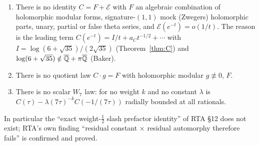 \begin{proposition}\label{prop:noscalar8}
\begin{enumerate}[label=(\roman*)]
\item There is no identity $C=F+\mathcal E$ with $F$ an algebraic combination of holomorphic modular forms, signature-$(1,1)$ mock (Zwegers) holomorphic parts, unary, partial or false theta series, and $\mathcal E(e^{-t})=o(1/t)$. The reason is the leading term $C(e^{-t})=I/t+a_Ct^{-1/2}+\cdots$ with $I=\log(6+\sqrt{35})/(2\sqrt{35})$ (Theorem~\ref{thm:C}) and $\log(6+\sqrt{35})\notin\overline{\mathbb{Q}}+\pi\overline{\mathbb{Q}}$ (Baker).
\item There is no quotient law $C\cdot g=F$ with holomorphic modular $g\not\equiv0$, $F$.
\item There is no scalar $W_7$ law: for no weight $k$ and no constant $\lambda$ is $C(\tau)-\lambda(7\tau)^{-k}C(-1/(7\tau))$ radially bounded at all rationals.
\end{enumerate}
In particular the ``exact weight-$\tfrac12$ slash prefactor identity'' of RTA \S12 does not exist; RTA's own finding ``residual constant $\times$ residual automorphy therefore fails'' is confirmed and proved.
\end{proposition}

